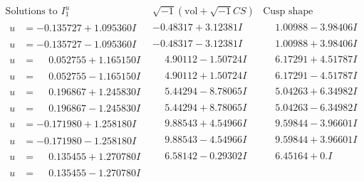 \documentclass[1p]{elsarticle_modified}
\theoremstyle{definition}
\newcommand{\I}{\sqrt{-1}}
\begin{document}
$$\begin{array}{c|c|c}  
\text{Solutions to }I^u_{1}& \I (\text{vol} + \sqrt{-1}CS) & \text{Cusp shape}\\
 \hline 
\begin{aligned}
u &= -0.135727 + 1.095360 I\end{aligned}
 & -0.48317 + 3.12381 I & \phantom{-}1.00988 - 3.98406 I \\ \hline\begin{aligned}
u &= -0.135727 - 1.095360 I\end{aligned}
 & -0.48317 - 3.12381 I & \phantom{-}1.00988 + 3.98406 I \\ \hline\begin{aligned}
u &= \phantom{-}0.052755 + 1.165150 I\end{aligned}
 & \phantom{-}4.90112 - 1.50724 I & \phantom{-}6.17291 + 4.51787 I \\ \hline\begin{aligned}
u &= \phantom{-}0.052755 - 1.165150 I\end{aligned}
 & \phantom{-}4.90112 + 1.50724 I & \phantom{-}6.17291 - 4.51787 I \\ \hline\begin{aligned}
u &= \phantom{-}0.196867 + 1.245830 I\end{aligned}
 & \phantom{-}5.44294 - 8.78065 I & \phantom{-}5.04263 + 6.34982 I \\ \hline\begin{aligned}
u &= \phantom{-}0.196867 - 1.245830 I\end{aligned}
 & \phantom{-}5.44294 + 8.78065 I & \phantom{-}5.04263 - 6.34982 I \\ \hline\begin{aligned}
u &= -0.171980 + 1.258180 I\end{aligned}
 & \phantom{-}9.88543 + 4.54966 I & \phantom{-}9.59844 - 3.96601 I \\ \hline\begin{aligned}
u &= -0.171980 - 1.258180 I\end{aligned}
 & \phantom{-}9.88543 - 4.54966 I & \phantom{-}9.59844 + 3.96601 I \\ \hline\begin{aligned}
u &= \phantom{-}0.135455 + 1.270780 I\end{aligned}
 & \phantom{-}6.58142 - 0.29302 I & \phantom{-}6.45164 + 0. I\phantom{ +0.000000I} \\ \hline\begin{aligned}
u &= \phantom{-}0.135455 - 1.270780 I\end{aligned}

\end{array}$$
\end{document}
